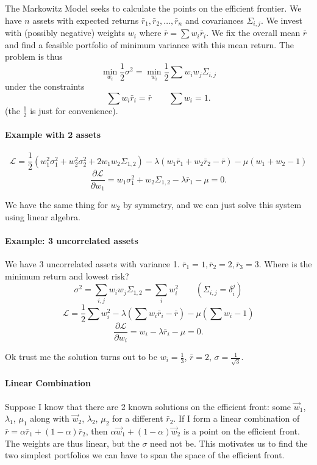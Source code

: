 \documentclass[12pt]{article}
\theoremstyle{remark}
\begin{document}
The Markowitz Model seeks to calculate the points on the efficient frontier. We have $n$ assets with expected returns $\bar r_1, \bar r_2, \dots, \bar r_n$ and covariances $\Sigma_{i,j}$. We invest with (possibly negative) weights $w_i$ where $\bar r = \sum w_i \bar r_i$. We fix the overall mean $\bar r$ and find a feasible portfolio of minimum variance with this mean return. The problem is thus \[\min_{w_i} \frac{1}{2}\sigma^2 =\min_{w_i}\frac{1}{2} \sum w_i w_j \Sigma_{i,j}\] under the constraints \[\sum w_i \bar r_i = \bar r \qquad \sum w_i = 1.\] (the $\frac{1}{2}$ is just for convenience).

\paragraph{Example with 2 assets} 
\[\mathcal{L} = \frac{1}{2} \left(w_1^2 \sigma_1^2 + w_2^2 \sigma_2^2+2w_1w_2\Sigma_{1,2}\right) - \lambda \left(w_1 \bar r_1 + w_2 \bar r_2 - \bar r\right) - \mu \left( w_1 + w_2 - 1\right)\]
\[ \frac{\partial \mathcal{L}}{\partial w_1} = w_1 \sigma_1^2 + w_2 \Sigma_{1,2}-\lambda \bar r_1 - \mu = 0.\]

We have the same thing for $w_2$ by symmetry, and we can just solve this system using linear algebra.

\paragraph{Example: 3 uncorrelated assets}
We have 3 uncorrelated assets with variance 1. $\bar r_1 = 1, \bar r_2 = 2, \bar r_3 = 3$. Where is the minimum return and lowest risk?
\[\sigma^2=\sum_{i,j} w_i w_j \Sigma_{1,2} = \sum_i w_i^2 \qquad (\Sigma_{i,j} = \delta_i^j)\]
\[\mathcal{L} = \frac{1}{2}\sum w_i^2  - \lambda\left(\sum w_i \bar r_i - \bar r\right) - \mu \left(\sum w_i - 1\right)\]
\[\frac{\partial \mathcal{L}}{\partial w_i} = w_i - \lambda \bar r_i - \mu = 0.\]

Ok trust me the solution turns out to be $w_i = \frac{1}{3}$, $\bar r = 2$, $\sigma = \frac{1}{\sqrt 3}$.

\paragraph{Linear Combination}
Suppose I know that there are 2 known solutions on the efficient front: some $\vec w_1$, $\lambda_1$, $\mu_1$ along with $\vec w_2$, $\lambda_2$, $\mu_2$ for a different $\bar r_2$. If I form a linear combination of $\bar r = \alpha \bar r_1 + (1-\alpha) \bar r_2$, then $\alpha \vec w_1 + (1-\alpha)\vec w_2$ is a point on the efficient front. The weights are thus linear, but the $\sigma$ need not be. This motivates us to find the two simplest portfolios we can have to span the space of the efficient front.
\end{document}
